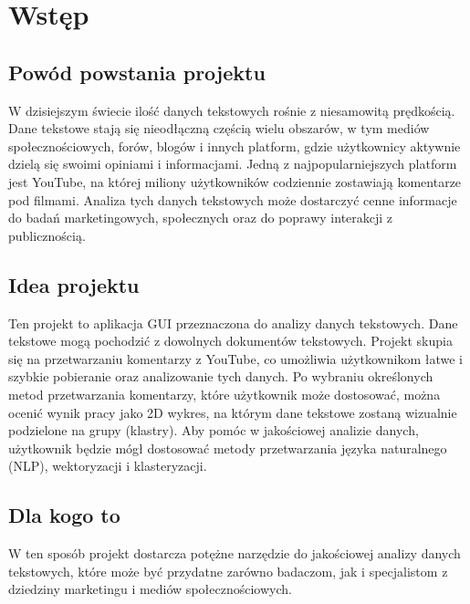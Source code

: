 \chapter*{Wstęp}
\section{Powód powstania projektu}
W dzisiejszym świecie ilość danych tekstowych rośnie z niesamowitą prędkością. Dane tekstowe stają się nieodłączną częścią wielu obszarów, w tym mediów społecznościowych, forów, blogów i innych platform, gdzie użytkownicy aktywnie dzielą się swoimi opiniami i informacjami. Jedną z najpopularniejszych platform jest YouTube, na której miliony użytkowników codziennie zostawiają komentarze pod filmami. Analiza tych danych tekstowych może dostarczyć cenne informacje do badań marketingowych, społecznych oraz do poprawy interakcji z publicznością.

\section{Idea projektu}
Ten projekt to aplikacja GUI przeznaczona do analizy danych tekstowych. Dane tekstowe mogą pochodzić z dowolnych dokumentów tekstowych. Projekt skupia się na przetwarzaniu komentarzy z YouTube, co umożliwia użytkownikom łatwe i szybkie pobieranie oraz analizowanie tych danych. Po wybraniu określonych metod przetwarzania komentarzy, które użytkownik może dostosować, można ocenić wynik pracy jako 2D wykres, na którym dane tekstowe zostaną wizualnie podzielone na grupy (klastry). Aby pomóc w jakościowej analizie danych, użytkownik będzie mógł dostosować metody przetwarzania języka naturalnego (NLP), wektoryzacji i klasteryzacji.

\section{Dla kogo to}
W ten sposób projekt dostarcza potężne narzędzie do jakościowej analizy danych tekstowych, które może być przydatne zarówno badaczom, jak i specjalistom z dziedziny marketingu i mediów społecznościowych.

